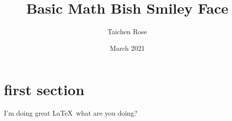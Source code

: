 \documentclass{article}
\title{Basic Math Bish Smiley Face}
\author{Taichen Rose}
\date{March 2021}
\begin{document}
\section{first section}

I'm doing great \LaTeX\ what are you doing?
\end{document}
